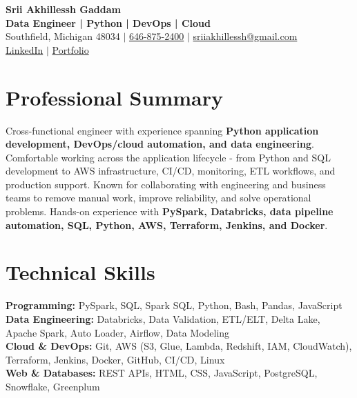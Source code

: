 \documentclass[letterpaper,10pt]{article}
\begin{document}
\fontsize{9.35pt}{10.45pt}\selectfont

\begin{center}
    {\LARGE \textbf{Srii Akhillessh Gaddam}} \\[-1pt]
    \textbf{Data Engineer | Python | DevOps | Cloud} \\[2pt]
    Southfield, Michigan 48034 $|$
    \href{tel:6468752400}{646-875-2400} $|$
    \href{mailto:sriiakhillessh@gmail.com}{sriiakhillessh@gmail.com} \\[1pt]
    \href{https://www.linkedin.com/in/srii-akhiilessh-gaddam-b48668191/}{LinkedIn} $|$
    \href{https://sriiakhillesshg.github.io/portfolio/}{Portfolio}
\end{center}
\vspace{-8pt}

\section{Professional Summary}
\small{Cross-functional engineer with experience spanning \textbf{Python application development, DevOps/cloud automation, and data engineering}. Comfortable working across the application lifecycle - from Python and SQL development to AWS infrastructure, CI/CD, monitoring, ETL workflows, and production support. Known for collaborating with engineering and business teams to remove manual work, improve reliability, and solve operational problems. Hands-on experience with \textbf{PySpark, Databricks, data pipeline automation, SQL, Python, AWS, Terraform, Jenkins, and Docker}.}

\section{Technical Skills}
\small{
\textbf{Programming:} PySpark, SQL, Spark SQL, Python, Bash, Pandas, JavaScript \\
\textbf{Data Engineering:} Databricks, Data Validation, ETL/ELT, Delta Lake, Apache Spark, Auto Loader, Airflow, Data Modeling \\
\textbf{Cloud \& DevOps:} Git, AWS (S3, Glue, Lambda, Redshift, IAM, CloudWatch), Terraform, Jenkins, Docker, GitHub, CI/CD, Linux \\
\textbf{Web \& Databases:} REST APIs, HTML, CSS, JavaScript, PostgreSQL, Snowflake, Greenplum
}

\end{document}
